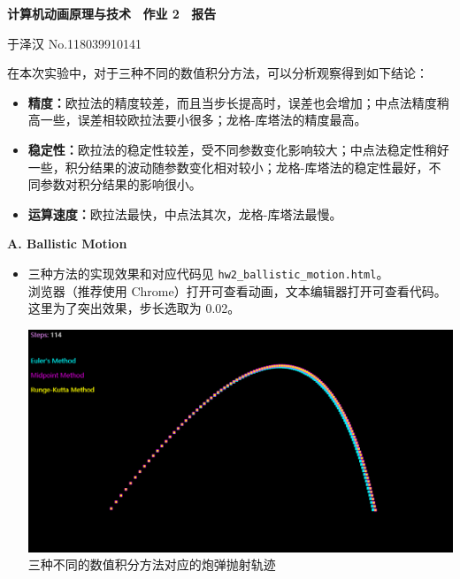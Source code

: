 \documentclass[a4paper, 12pt]{article}
\begin{document}
\begin{center}
{\bfseries {计算机动画原理与技术 ~作业 2 ~报告}}

\vspace{0.5\baselineskip}

{ \kaishu 于泽汉 \hspace{1em} \textsf{No.118039910141}}
\end{center}

在本次实验中，对于三种不同的数值积分方法，可以分析观察得到如下结论：

\begin{itemize}[leftmargin=2em, label={}]
\item \textbf{精度：}欧拉法的精度较差，而且当步长提高时，误差也会增加；中点法精度稍高一些，误差相较欧拉法要小很多；龙格-库塔法的精度最高。

\item \textbf{稳定性：}欧拉法的稳定性较差，受不同参数变化影响较大；中点法稳定性稍好一些，积分结果的波动随参数变化相对较小；龙格-库塔法的稳定性最好，不同参数对积分结果的影响很小。

\item \textbf{运算速度：}欧拉法最快，中点法其次，龙格-库塔法最慢。

\end{itemize}

\vspace{\baselineskip}

\textbf{A. Ballistic Motion}

\begin{itemize}[leftmargin=2em, label={}]

\item 三种方法的实现效果和对应代码见 \texttt{hw2\_ballistic\_motion.html}。\\
浏览器（推荐使用 Chrome）打开可查看动画，文本编辑器打开可查看代码。\\
这里为了突出效果，步长选取为 0.02。

\begin{center}
\includegraphics[width=\textwidth]{images/ballistic_motion.png}\\
三种不同的数值积分方法对应的炮弹抛射轨迹
\end{center}

\end{itemize}
\end{document}
